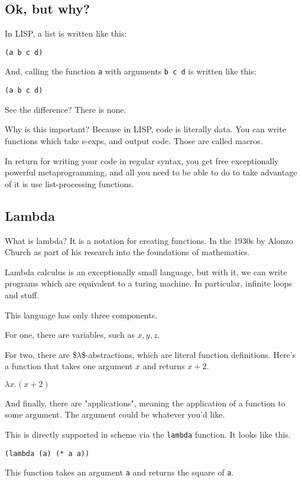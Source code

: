 \documentclass[11pt]{article}
\begin{document}
\subsection{Ok, but why?}
\label{sec:org9b29333}
In LISP, a list is written like this:
\begin{verbatim}
(a b c d)
\end{verbatim}
And, calling the function \texttt{a} with arguments \texttt{b c d} is written
like this:
\begin{verbatim}
(a b c d)
\end{verbatim}
See the difference? There is none.

Why is this important? Because in LISP, code is literally data. You
can write functions which take s-exps, and output code. Those are
called macros.

In return for writing your code in regular syntax, you get free
exceptionally powerful metaprogramming, and all you need to be able
to do to take advantage of it is use list-processing functions.

\subsection{Lambda}
\label{sec:org89670a5}
What is lambda? It is a notation for creating functions. In the
1930s by Alonzo Church as part of his research into the foundations
of mathematics.

Lambda calculus is an exceptionally small language, but with it, we
can write programs which are equivalent to a turing machine. In
particular, infinite loops and stuff.

This language has only three components.

For one, there are variables, such as \(x, y, z\).

For two, there are \$\(\lambda\)\$-abstractions, which are literal function
definitions. Here's a function that takes one argument \(x\) and
returns \(x + 2\).

$\lambda x. (x + 2)$

And finally, there are "applications", meaning the application of a
function to some argument. The argument could be whatever you'd
like.

This is directly supported in scheme via the \texttt{lambda} function. It
looks like this.
\begin{verbatim}
(lambda (a) (* a a))
\end{verbatim}
This function takes an argument \texttt{a} and returns the square of \texttt{a}.
\end{document}
